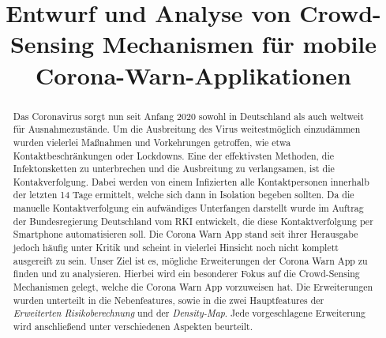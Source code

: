 \documentclass[conference,compsoc]{IEEEtran}
\begin{document}
\title{Entwurf und Analyse von Crowd-Sensing Mechanismen für mobile Corona-Warn-Applikationen}

\author{
\and
{} 
\and
{}
\and
{}
}

\maketitle

\begin{abstract}
Das Coronavirus sorgt nun seit Anfang 2020 sowohl in Deutschland als auch weltweit für Ausnahmezustände. 
Um die Ausbreitung des Virus weitestmöglich einzudämmen wurden vielerlei Maßnahmen und Vorkehrungen getroffen, wie etwa Kontaktbeschränkungen oder Lockdowns.
Eine der effektivsten Methoden, die Infektonsketten zu unterbrechen und die Ausbreitung zu verlangsamen, ist die Kontakverfolgung. 
Dabei werden von einem Infizierten alle Kontaktpersonen innerhalb der letzten 14 Tage ermittelt, welche sich dann in Isolation begeben sollten. 
Da die manuelle Kontaktverfolgung ein aufwändiges Unterfangen darstellt wurde im Auftrag der Bundesregierung Deutschland vom RKI entwickelt, die diese Kontaktverfolgung per Smartphone automatisieren soll. 
Die Corona Warn App stand seit ihrer Herausgabe jedoch häufig unter Kritik und scheint in vielerlei Hinsicht noch nicht komplett ausgereift zu sein.
Unser Ziel ist es, mögliche Erweiterungen der Corona Warn App zu finden und zu analysieren.
Hierbei wird ein besonderer Fokus auf die Crowd-Sensing Mechanismen gelegt, welche die Corona Warn App vorzuweisen hat. 
Die Erweiterungen wurden unterteilt in die Nebenfeatures, sowie in die zwei Hauptfeatures der \textit{Erweiterten Risikoberechnung} und der \textit{Density-Map}.
Jede vorgeschlagene Erweiterung wird anschließend unter verschiedenen Aspekten beurteilt. 
\end{abstract}
\end{document}
